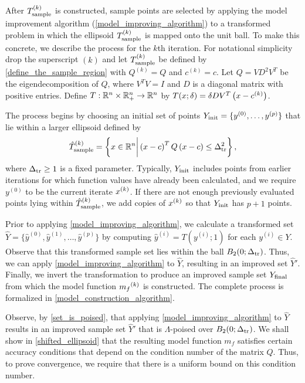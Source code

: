 \documentclass{article}
\begin{document}
After  ${T_{\text{sample}}^{(k)}}$ is constructed,  sample points are selected by applying the model improvement algorithm  (\cref{model_improving_algorithm}) 
to a transformed problem in which the ellipsoid ${T_{\text{sample}}^{(k)}}$ is mapped onto the unit ball.   
To make this concrete,  we describe the process for the $k$th iteration.  For notational simplicity drop the superscript $(k)$ and let ${T_{\text{sample}}^{(k)}}$ be defined by \cref{define_the_sample_region} with $Q^{(k)}=Q$ and $c^{(k)}=c$.     
Let $Q= V D^2 V^T$ be the eigendecomposition  of $Q$, where $V^TV = I$ and $D$ is a diagonal matrix with positive entries.  Define
$T:\mathbb R^n \times \mathbb R^n_+ \rightarrow \mathbb R^n$ by $T(x; \delta) = \delta DV^T\left(x - c^{(k)}\right)$.

The process begins by choosing an initial set of points $Y_{\textrm{init}}=\{y^{(0)}, \ldots,  y^{(p)}\}$ that 
lie within a larger ellipsoid defined by
\begin{equation}
\label{define_the_big_sample_region}
{\hat{T}_{\text{sample}}^{(k)}} = \left\{x \in \mathbb R^n \bigg | \left(x - c \right)^T Q \left(x - c\right) \le \Delta_{\textrm{tr}}^2 \right\},
\end{equation}
where $\Delta_{\textrm{tr}} \ge 1$ is a fixed parameter. 
Typically, $Y_{\textrm{init}}$ includes points from earlier iterations for which function values have already been calculated,  and we require $y^{(0)}$ to be  the current iterate $x^{(k)}$.    If there are not enough previously evaluated points lying within ${\hat{T}_{\text{sample}}^{(k)}}$,  we add copies of $x^{(k)}$ so that $Y_{\textrm{init}}$ has $p+1$ points.

Prior to applying \cref{model_improving_algorithm},  we calculate a transformed set $\hat{Y}=\{\hat{y}^{(0)}, \hat{y}^{(1)},\ldots,\hat{y}^{(p)}\}$ by computing $\hat{y}^{(i)} = T(y^{(i)};1)$ for each $y^{(i)} \in Y$.    Observe that this transformed sample set lies within the ball $B_2(0;\Delta_{\textrm{tr}})$.   Thus, we can apply \cref{model_improving_algorithm} to $\hat{Y}$, resulting in an improved set $\hat{Y}'$.  Finally, we invert the transformation to produce an improved sample set $Y_{\textrm{final}}$ from which the model function ${{m}_f}^{(k)}$ is constructed.     
The complete process is formalized in \cref{model_construction_algorithm}.

Observe, by \cref{set_is_poised}, that applying 
\cref{model_improving_algorithm} to $\hat{Y}$ results in an improved sample set $\hat{Y}'$ that is $\Lambda$-poised over $B_2(0; \Delta_{\textrm{tr}})$.    We shall show in \cref{shifted_ellipsoid} that the resulting model function $m_f$ satisfies certain accuracy conditions that depend on the condition number of the matrix $Q$.   Thus, to prove convergence, we require that there  is a uniform bound on this condition number.  
\end{document}
